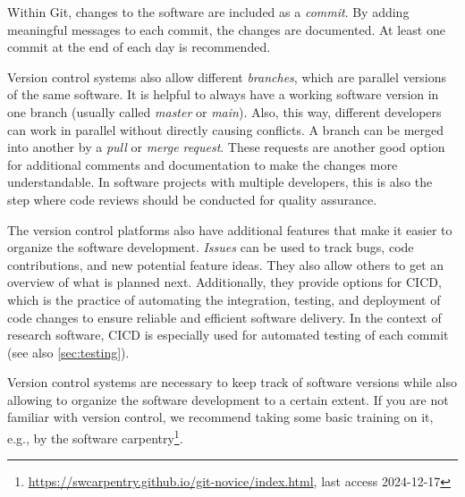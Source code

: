 Within Git, changes to the software are included as a \textit{commit}. By adding meaningful messages to each commit, the changes are documented. At least one commit at the end of each day is recommended. 

Version control systems also allow different \textit{branches}, which are parallel versions of the same software. It is helpful to always have a working software version in one branch (usually called \textit{master} or \textit{main}). Also, this way, different developers can work in parallel without directly causing conflicts. A branch can be merged into another by a \textit{pull} or \textit{merge request}. These requests are another good option for additional comments and documentation to make the changes more understandable. In software projects with multiple developers, this is also the step where code reviews should be conducted for quality assurance.

The version control platforms also have additional features that make it easier to organize the software development. \textit{Issues} can be used to track bugs, code contributions, and new potential feature ideas. They also allow others to get an overview of what is planned next. Additionally, they provide options for \ac{CICD}, which is the practice of automating the integration, testing, and deployment of code changes to ensure reliable and efficient software delivery. In the context of research software, \ac{CICD} is especially used for automated testing of each commit (see also \ref{sec:testing}).

\par 
Version control systems are necessary to keep track of software versions while also allowing to organize the software development to a certain extent. If you are not familiar with version control, we recommend taking some basic training on it, e.g., by the software carpentry\footnote{\url{https://swcarpentry.github.io/git-novice/index.html}, last access 2024-12-17}.  

